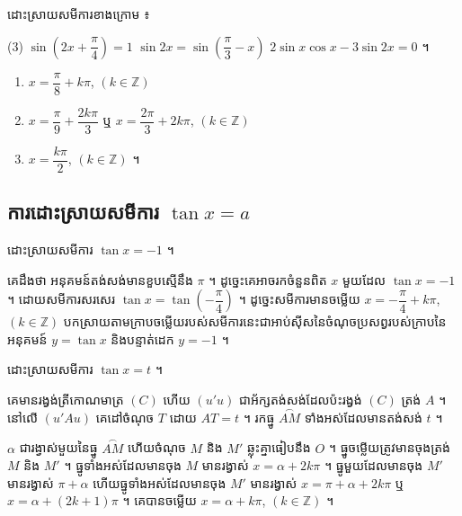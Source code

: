 \begin{pro}
ដោះស្រាយសមីការខាងក្រោម ៖
\begin{tasks}(3)
  \task $\sin\left(2x + \dfrac{\pi}{4}\right) = 1$
  \task $\sin 2x = \sin\left(\dfrac{\pi}{3} - x\right)$
  \task $2\sin x\cos x - 3\sin 2x = 0$ ។
\end{tasks}
\ans
\begin{enumerate}[a]
  \item $x = \dfrac{\pi}{8} + k\pi$, $(k \in \mathbb{Z})$
  \item $x = \dfrac{\pi}{9} + \dfrac{2k\pi}{3}$ ឬ $x = \dfrac{2\pi}{3} + 2k\pi$, $(k \in \mathbb{Z})$
  \item $x = \dfrac{k\pi}{2}$, $(k \in \mathbb{Z})$ ។
\end{enumerate}
\end{pro}

\subsection{ការដោះស្រាយសមីការ \texorpdfstring{$\tan x = a$}{tan x = a}}

\begin{example}[ឧទាហរណ៍ ១]
ដោះស្រាយសមីការ $\tan x = -1$ ។

គេដឹងថា អនុគមន៍តង់សង់មានខួបស្មើនឹង $\pi$ ។ ដូច្នេះគេអាចរកចំនួនពិត $x$ មួយដែល $\tan x = -1$ ។ ដោយសមីការសរសេរ $\tan x = \tan\left(-\dfrac{\pi}{4}\right)$ ។ ដូច្នេះសមីការមានចម្លើយ $x = -\dfrac{\pi}{4} + k\pi$, $(k \in \mathbb{Z})$ បកស្រាយតាមក្រាបចម្លើយរបស់សមីការនេះជាអាប់ស៊ីសនៃចំណុចប្រសព្វរបស់ក្រាបនៃអនុគមន៍ $y = \tan x$ និងបន្ទាត់ដេក $y = -1$ ។
\end{example}

\begin{example}[ឧទាហរណ៍ ២]
ដោះស្រាយសមីការ $\tan x = t$ ។

គេមានរង្វង់ត្រីកោណមាត្រ $(C)$ ហើយ $(u'u)$ ជាអ័ក្សតង់សង់ដែលប៉ះរង្វង់ $(C)$ ត្រង់ $A$ ។ នៅលើ $(u'Au)$ គេដៅចំណុច $T$ ដោយ $AT = t$ ។ រកធ្នូ $\overset{\frown}{AM}$ ទាំងអស់ដែលមានតង់សង់ $t$ ។
\begin{center}
\end{center}
$\alpha$ ជារង្វាស់មួយនៃធ្នូ $\overset{\frown}{AM}$ ហើយចំណុច $M$ និង $M'$ ឆ្លុះគ្នាធៀបនឹង $O$ ។ ធ្នូចម្លើយត្រូវមានចុងត្រង់ $M$ និង $M'$ ។ ធ្នូទាំងអស់ដែលមានចុង $M$ មានរង្វាស់ $x = \alpha + 2k\pi$ ។ ធ្នូមួយដែលមានចុង $M'$ មានរង្វាស់ $\pi + \alpha$ ហើយធ្នូទាំងអស់ដែលមានចុង $M'$ មានរង្វាស់ $x = \pi + \alpha + 2k\pi$ ឬ $x = \alpha + (2k + 1)\pi$ ។ គេបានចម្លើយ $x = \alpha + k\pi$, $(k \in \mathbb{Z})$ ។
\end{example}

